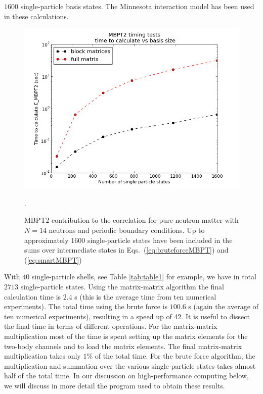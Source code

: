$1600$ single-particle basis states. The Minnesota interaction model has been used in these calculations.  
\begin{figure}
    \includegraphics[width=\linewidth]{Chapter8-figures/blockvsfull_log.png}
    \caption{MBPT2 contribution to the correlation for pure neutron matter with $N=14$ neutrons and periodic boundary conditions. Up to approximately 1600 single-particle states have been included in the sums over intermediate states in Eqs.~(\ref{eq:bruteforceMBPT}) and (\ref{eq:smartMBPT})}. 
    \label{fig:speedup1}
  \end{figure}
With $40$ single-particle shells, see Table \ref{tab:table1} for example, we have in total  $2713$ single-particle states. 
Using the matrix-matrix algorithm the final calculation time is $2.4$ s (this is the average time from ten numerical experiments).
The total time using the brute force is $100.6$ s (again the average of ten numerical experiments), resulting in a speed up of 42. It is useful to dissect the final time in terms of different operations.
For the matrix-matrix multiplication most of the time is spent setting up the matrix elements for the two-body channels and to load the matrix elements. The final matrix-matrix multiplication takes only $1\%$ of the total time. For the brute force algorithm, the multiplication and summation over the various single-particle states takes almost half of the total time. In our discussion on high-performance computing below, we will discuss in more detail the program used to obtain these results.



